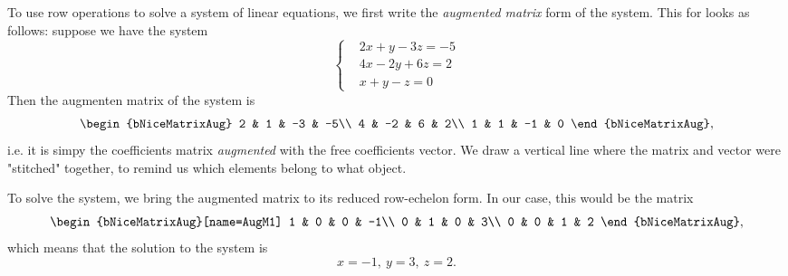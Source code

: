 To use row operations to solve a system of linear equations, we first write the \emph{augmented matrix} form of the system. This for looks as follows: suppose we have the system
\[
	\begin{cases}
		&2x+y-3z  = -5\\
		&4x-2y+6z =  2\\
		&x+y-z    =  0
	\end{cases}
\]
Then the augmenten matrix of the system is
\[
	\begin{bNiceMatrixAug}
		2 &  1 & -3 & -5\\
		4 & -2 &  6 &  2\\
		1 &  1 & -1 &  0
	\end{bNiceMatrixAug},
\]
i.e. it is simpy the coefficients matrix \textit{augmented} with the free coefficients vector. We draw a vertical line where the matrix and vector were "stitched" together, to remind us which elements belong to what object.

To solve the system, we bring the augmented matrix to its reduced row-echelon form. In our case, this would be the matrix
\[
	\begin{bNiceMatrixAug}[name=AugM1]
		1 & 0 & 0 & -1\\
		0 & 1 & 0 &  3\\
		0 & 0 & 1 &  2
	\end{bNiceMatrixAug},
\]
which means that the solution to the system is
\[
	x=-1,\ y=3,\ z=2.
\]

